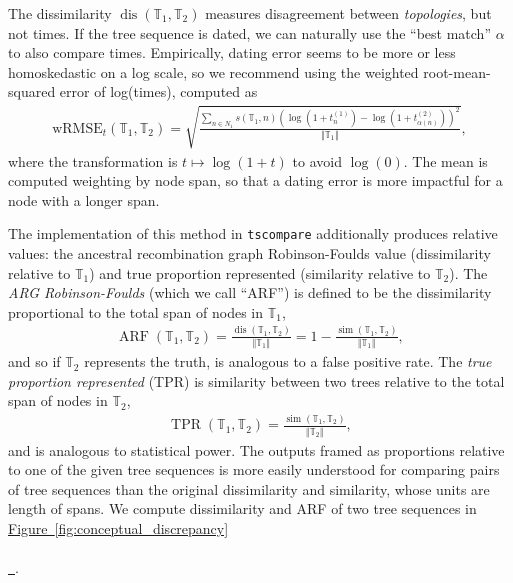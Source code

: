 \documentclass[10pt,twoside,lineno]{gsajnl}
\newcommand{\T}{\mathbb{T}}
\newcommand{\dis}{\operatorname{dis}}
\newcommand{\similarity}{\operatorname{sim}}
\newcommand*{\figref}[2][]{%
	\hyperref[{#2}]{%
		Figure~\ref*{#2}%
		\ifx\\#1\\%
		\else
		\,#1%
		\fi
	}%
}
\begin{document}
The dissimilarity $\dis(\T_1, \T_2)$ measures disagreement between \emph{topologies},
but not times.
If the tree sequence is dated, we can naturally use the ``best match'' $\alpha$
to also compare times.
Empirically, dating error seems to be more or less homoskedastic on a log scale,
so we recommend 
using the weighted root-mean-squared error of log(times), computed as
\begin{align}\label{eqn:wrmse}
    \text{wRMSE}_t(\T_1, \T_2)
    = \sqrt{\frac{
        \sum_{n \in N_1} s(\T_1,n) \left(\log\left(1+ t^{(1)}_n\right) - \log\left(1+ t^{(2)}_{\alpha(n)}\right) \right)^2 
    }{
        \Vert{\T_1}\Vert
    } } ,
\end{align}
where the transformation is $t \mapsto \log(1 + t)$ to avoid $\log(0)$.
The mean is computed weighting by node span, so that a dating error
is more impactful for a node with a longer span. 

The implementation of this method in \texttt{tscompare}
additionally produces relative values:
the ancestral recombination graph Robinson-Foulds value (dissimilarity relative to $\T_1$)
and true proportion represented (similarity relative to $\T_2$).
The \emph{ARG Robinson-Foulds} (which we call ``ARF'') is defined to be the dissimilarity proportional
 to the total span of nodes in $\T_1$,
 \begin{align}\label{eqn:dissimilarity}
 	\operatorname{ARF}(\T_1,\T_2)=\frac{\dis(\T_1,\T_2)}{\Vert \T_1 \Vert}
 	=1-\frac{\similarity(\T_1,\T_2)}{\Vert \T_1\Vert} ,
\end{align}
and so if $\T_2$ represents the truth, is analogous to a false positive rate.
The \emph{true proportion represented} (TPR) is similarity between two trees relative 
to the total span of nodes in $\T_2$,
\begin{align}\label{eqn:true-proportion}
	\operatorname{TPR}(\T_1,\T_2) = \frac{\similarity(\T_1,\T_2)}
	{\Vert \T_2\Vert} ,
\end{align}
and is analogous to statistical power.
The outputs framed as proportions relative to one of the given tree sequences is more easily understood
for comparing pairs of tree sequences than the original dissimilarity and similarity, whose units are length of spans.
We compute dissimilarity and ARF of two tree sequences in \figref{fig:conceptual_discrepancy}.
\end{document}
